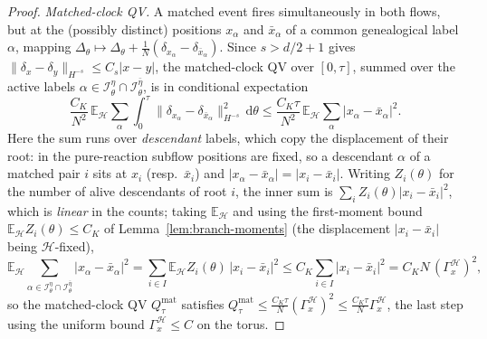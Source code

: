 \documentclass[a4paper,fleqn]{cas-sc}
\theoremstyle{definition}
\theoremstyle{remark}
\begin{document}
\begin{proof}
\emph{Matched-clock QV.} A matched event fires simultaneously in both flows, but
at the (possibly distinct) positions $x_\alpha$ and $\bar x_\alpha$ of a common
genealogical label $\alpha$, mapping
$\Delta_\theta\mapsto\Delta_\theta+\frac1N(\delta_{x_\alpha}-\delta_{\bar x_\alpha})$.
Since $s>d/2+1$ gives $\|\delta_x-\delta_y\|_{H^{-s}}\le C_s|x-y|$, the
matched-clock QV over $[0,\tau]$, summed over the active labels
$\alpha\in\mathcal I^\eta_\theta\cap\mathcal I^{\bar\eta}_\theta$, is in conditional
expectation
\[
\frac{C_K}{N^2}\,\mathbb E_{\mathcal H}\!\sum_{\alpha}\int_0^\tau\|\delta_{x_\alpha}-\delta_{\bar x_\alpha}\|_{H^{-s}}^2\,\mathrm d\theta
\le\frac{C_K\tau}{N^2}\,\mathbb E_{\mathcal H}\!\sum_{\alpha}|x_\alpha-\bar x_\alpha|^2 .
\]
Here the sum runs over \emph{descendant} labels, which copy the displacement of
their root: in the pure-reaction subflow positions are fixed, so a descendant
$\alpha$ of a matched pair $i$ sits at $x_i$ (resp.\ $\bar x_i$) and
$|x_\alpha-\bar x_\alpha|=|x_i-\bar x_i|$. Writing $Z_i(\theta)$ for the number of
alive descendants of root $i$, the inner sum is $\sum_i Z_i(\theta)|x_i-\bar x_i|^2$,
which is \emph{linear} in the counts; taking $\mathbb E_{\mathcal H}$ and using the
first-moment bound $\mathbb E_{\mathcal H}Z_i(\theta)\le C_K$ of
Lemma~\ref{lem:branch-moments} (the displacement $|x_i-\bar x_i|$ being
$\mathcal H$-fixed),
\[
\mathbb E_{\mathcal H}\!\!\sum_{\alpha\in\mathcal I^\eta_\theta\cap\mathcal I^{\bar\eta}_\theta}\!\!|x_\alpha-\bar x_\alpha|^2
=\sum_{i\in I}\mathbb E_{\mathcal H}Z_i(\theta)\,|x_i-\bar x_i|^2
\le C_K\sum_{i\in I}|x_i-\bar x_i|^2=C_KN\,(\Gamma_x^{\mathcal H})^2,
\]
so the matched-clock QV $Q^{\mathrm{mat}}_\tau$ satisfies
$Q^{\mathrm{mat}}_\tau\le\frac{C_K\tau}{N}(\Gamma_x^{\mathcal H})^2\le\frac{C_K\tau}{N}\Gamma_x^{\mathcal H}$,
the last step using the uniform bound $\Gamma_x^{\mathcal H}\le C$ on the torus.


\end{proof}
\end{document}
